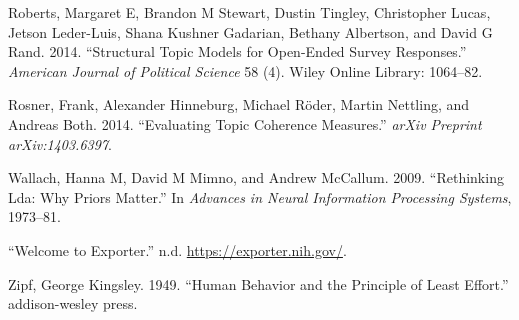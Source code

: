 \documentclass[conference,final,]{IEEEtran}
\begin{document}
\leavevmode\hypertarget{ref-roberts2014structural}{}%
Roberts, Margaret E, Brandon M Stewart, Dustin Tingley, Christopher
Lucas, Jetson Leder-Luis, Shana Kushner Gadarian, Bethany Albertson, and
David G Rand. 2014. ``Structural Topic Models for Open-Ended Survey
Responses.'' \emph{American Journal of Political Science} 58 (4). Wiley
Online Library: 1064--82.

\leavevmode\hypertarget{ref-rosner2014evaluating}{}%
Rosner, Frank, Alexander Hinneburg, Michael Röder, Martin Nettling, and
Andreas Both. 2014. ``Evaluating Topic Coherence Measures.'' \emph{arXiv
Preprint arXiv:1403.6397}.

\leavevmode\hypertarget{ref-wallach2009rethinking}{}%
Wallach, Hanna M, David M Mimno, and Andrew McCallum. 2009. ``Rethinking
Lda: Why Priors Matter.'' In \emph{Advances in Neural Information
Processing Systems}, 1973--81.

\leavevmode\hypertarget{ref-nih}{}%
``Welcome to Exporter.'' n.d. \url{https://exporter.nih.gov/}.

\leavevmode\hypertarget{ref-zipf1949human}{}%
Zipf, George Kingsley. 1949. ``Human Behavior and the Principle of Least
Effort.'' addison-wesley press.
\end{document}
